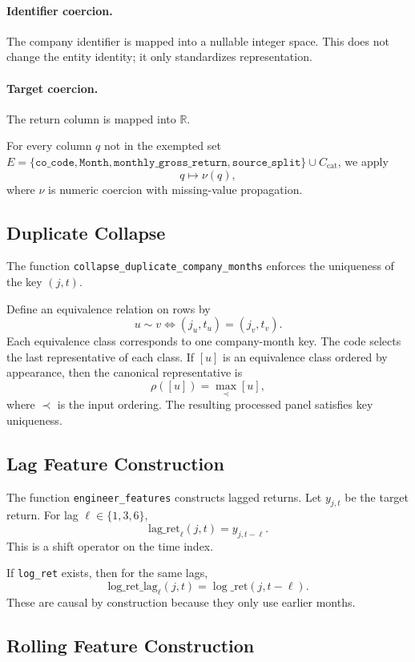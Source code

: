 \documentclass[11pt]{article}
\newcommand{\R}{\mathbb{R}}
\newcommand{\1}{\mathbf{1}}
\begin{document}
\paragraph{Identifier coercion.}
The company identifier is mapped into a nullable integer space. This does not change the entity identity; it only standardizes representation.

\paragraph{Target coercion.}
The return column is mapped into $\R$.

For every column $q$ not in the exempted set $E = \{\texttt{co\_code}, \texttt{Month}, \texttt{monthly\_gross\_return}, \texttt{source\_split}\} \cup C_{\mathrm{cat}}$, we apply
\[
q \mapsto \nu(q),
\]
where $\nu$ is numeric coercion with missing-value propagation.

\subsection{Duplicate Collapse}

The function \texttt{collapse\_duplicate\_company\_months} enforces the uniqueness of the key $(j,t)$.

Define an equivalence relation on rows by
\[
u \sim v \iff (j_u,t_u) = (j_v,t_v).
\]
Each equivalence class corresponds to one company-month key. The code selects the last representative of each class. If $[u]$ is an equivalence class ordered by appearance, then the canonical representative is
\[
\rho([u]) = \max_{\prec} [u],
\]
where $\prec$ is the input ordering. The resulting processed panel satisfies key uniqueness.

\subsection{Lag Feature Construction}

The function \texttt{engineer\_features} constructs lagged returns. Let $y_{j,t}$ be the target return. For lag $\ell \in \{1,3,6\}$,
\[
\mathrm{lag\_ret}_{\ell}(j,t) = y_{j,t-\ell}.
\]
This is a shift operator on the time index.

If \texttt{log\_ret} exists, then for the same lags,
\[
\mathrm{log\_ret\_lag}_{\ell}(j,t) = \log\_\mathrm{ret}(j,t-\ell).
\]
These are causal by construction because they only use earlier months.

\subsection{Rolling Feature Construction}
\end{document}
